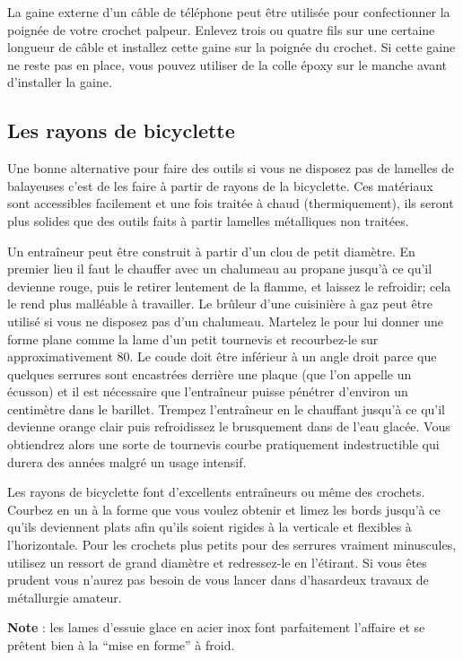 \documentclass[a4paper,french,11pt,twoside]{report}
\begin{document}
La gaine externe d'un câble de téléphone peut être utilisée pour confectionner la poignée de votre crochet palpeur. Enlevez trois ou quatre fils sur une certaine longueur de câble et installez cette gaine sur la poignée du crochet. Si cette gaine ne reste pas en place, vous pouvez utiliser de la colle époxy sur le manche avant d'installer la gaine.

\subsection{Les rayons de bicyclette}

Une bonne alternative pour faire des outils si vous ne disposez pas de lamelles de balayeuses c'est de les faire à partir de rayons de la bicyclette. Ces matériaux sont accessibles facilement et une fois traitée à chaud (thermiquement), ils seront plus solides que des outils faits à partir lamelles métalliques non traitées.

Un entraîneur peut être construit à partir d'un clou de petit diamètre. En premier lieu il faut le chauffer avec un chalumeau au propane jusqu'à ce qu'il devienne rouge, puis le retirer lentement de la flamme, et laissez le refroidir; cela le rend plus malléable à travailler. Le brûleur d'une cuisinière à gaz peut être utilisé si vous ne disposez pas d'un chalumeau. Martelez le pour lui donner une forme plane comme la lame d'un petit tournevis et recourbez-le sur approximativement 80\degres. Le coude doit être inférieur à un angle droit parce que quelques serrures sont encastrées derrière une plaque (que l'on appelle un écusson) et il est nécessaire que l'entraîneur puisse pénétrer d'environ un centimètre dans le barillet. Trempez l'entraîneur en le chauffant jusqu'à ce qu'il devienne orange clair puis refroidissez le brusquement dans de l'eau glacée. Vous obtiendrez alors une sorte de tournevis courbe pratiquement indestructible qui durera des années malgré un usage intensif.

Les rayons de bicyclette font d'excellents entraîneurs ou même des crochets. Courbez en un à la forme que vous voulez obtenir et limez les bords jusqu'à ce qu'ils deviennent plats afin qu'ils soient rigides à la verticale et flexibles à l'horizontale. Pour les crochets plus petits pour des serrures vraiment minuscules, utilisez un ressort de grand diamètre et redressez-le en l'étirant. Si vous êtes prudent vous n'aurez pas besoin de vous lancer dans d'hasardeux travaux de métallurgie amateur.

\medskip
\noindent \textbf{Note} : les lames d'essuie glace en acier inox font parfaitement l'affaire et se prêtent bien à la \enquote{mise en forme} à froid.
\end{document}
